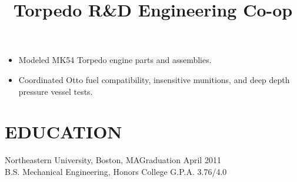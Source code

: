 \documentclass[line]{res}
\begin{document}
\begin{resume}
\title{Torpedo R\&D Engineering Co-op}
\begin {position}
\vspace {-10 pt}
\begin{itemize}
\item Modeled MK54 Torpedo engine parts and assemblies.
\item Coordinated Otto fuel compatibility, insensitive munitions, and deep depth
    pressure vessel tests.
\end{itemize}
\end{position}

\section{EDUCATION}
Northeastern University, Boston, MA\hfill Graduation April 2011 \\
B.S. Mechanical Engineering, Honors College \hfill G.P.A. 3.76/4.0 \

\end{resume}
\end{document}
